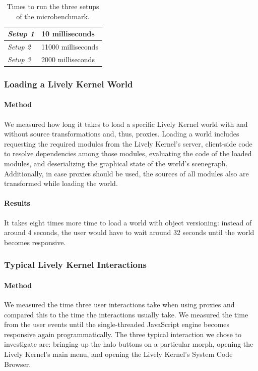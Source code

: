 \documentclass{sigplanconf}
\begin{document}
\begin{table}[h]
\begin{center}
\begin{tabular}{| l | l |}
\hline
\emph{Setup 1} & 10 milliseconds \\ \hline
\emph{Setup 2} & 11000 milliseconds \\ \hline
\emph{Setup 3} & 2000 milliseconds \\ \hline
\end{tabular}
\end{center}
\caption[Table caption text]{Times to run the three setups of the microbenchmark.}
\label{table:microbenchmarkResults}
\end{table}

\subsubsection{Loading a Lively Kernel World}

\paragraph{Method}
We measured how long it takes to load a specific Lively Kernel world
with and without source transformations and, thus, proxies.  Loading a
world includes requesting the required modules from the Lively
Kernel's server, client-side code to resolve dependencies among those
modules, evaluating the code of the loaded modules, and deserializing
the graphical state of the world's scenegraph.  Additionally, in case
proxies should be used, the sources of all modules also are
transformed while loading the world.

\paragraph{Results}
It takes eight times more time to load a world with object versioning:
instead of around 4 seconds, the user would have to wait around 32
seconds until the world becomes responsive.

\subsubsection{Typical Lively Kernel Interactions}

\paragraph{Method}
We measured the time three user interactions take when using proxies
and compared this to the time the interactions usually take.  We
measured the time from the user events until the single-threaded
JavaScript engine becomes responsive again programmatically.  The
three typical interaction we chose to investigate are: bringing up the
halo buttons on a particular morph, opening the Lively Kernel's main
menu, and opening the Lively Kernel's System Code Browser.
\end{document}
